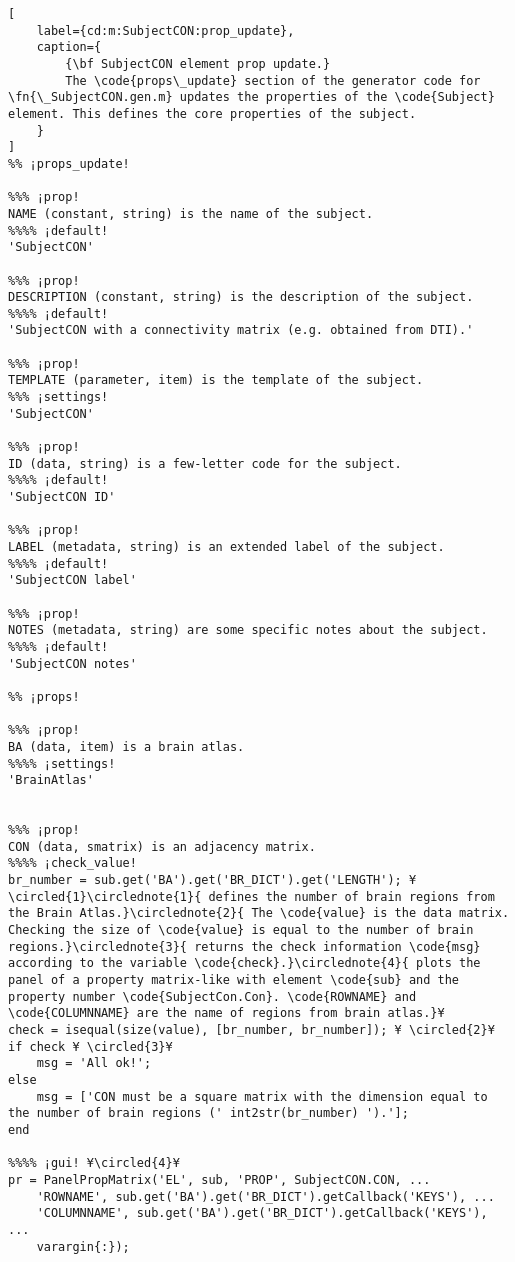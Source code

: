 \documentclass{tufte-handout}
\begin{document}
\begin{lstlisting}[
	label={cd:m:SubjectCON:prop_update},
	caption={
		{\bf SubjectCON element prop update.}
		The \code{props\_update} section of the generator code for \fn{\_SubjectCON.gen.m} updates the properties of the \code{Subject} element. This defines the core properties of the subject.
	}
]
%% ¡props_update!

%%% ¡prop!
NAME (constant, string) is the name of the subject.
%%%% ¡default!
'SubjectCON'

%%% ¡prop!
DESCRIPTION (constant, string) is the description of the subject.
%%%% ¡default!
'SubjectCON with a connectivity matrix (e.g. obtained from DTI).'

%%% ¡prop!
TEMPLATE (parameter, item) is the template of the subject.
%%% ¡settings!
'SubjectCON'

%%% ¡prop!
ID (data, string) is a few-letter code for the subject.
%%%% ¡default!
'SubjectCON ID'

%%% ¡prop!
LABEL (metadata, string) is an extended label of the subject.
%%%% ¡default!
'SubjectCON label'

%%% ¡prop!
NOTES (metadata, string) are some specific notes about the subject.
%%%% ¡default!
'SubjectCON notes'

%% ¡props!

%%% ¡prop! 
BA (data, item) is a brain atlas.
%%%% ¡settings!
'BrainAtlas'


%%% ¡prop! 
CON (data, smatrix) is an adjacency matrix.
%%%% ¡check_value!
br_number = sub.get('BA').get('BR_DICT').get('LENGTH'); ¥\circled{1}\circlednote{1}{ defines the number of brain regions from the Brain Atlas.}\circlednote{2}{ The \code{value} is the data matrix. Checking the size of \code{value} is equal to the number of brain regions.}\circlednote{3}{ returns the check information \code{msg} according to the variable \code{check}.}\circlednote{4}{ plots the panel of a property matrix-like with element \code{sub} and the property number \code{SubjectCon.Con}. \code{ROWNAME} and \code{COLUMNNAME} are the name of regions from brain atlas.}¥
check = isequal(size(value), [br_number, br_number]); ¥ \circled{2}¥
if check ¥ \circled{3}¥
    msg = 'All ok!';
else   
    msg = ['CON must be a square matrix with the dimension equal to the number of brain regions (' int2str(br_number) ').'];
end

%%%% ¡gui! ¥\circled{4}¥
pr = PanelPropMatrix('EL', sub, 'PROP', SubjectCON.CON, ...
    'ROWNAME', sub.get('BA').get('BR_DICT').getCallback('KEYS'), ...
    'COLUMNNAME', sub.get('BA').get('BR_DICT').getCallback('KEYS'), ...
    varargin{:});
\end{lstlisting}
\end{document}

